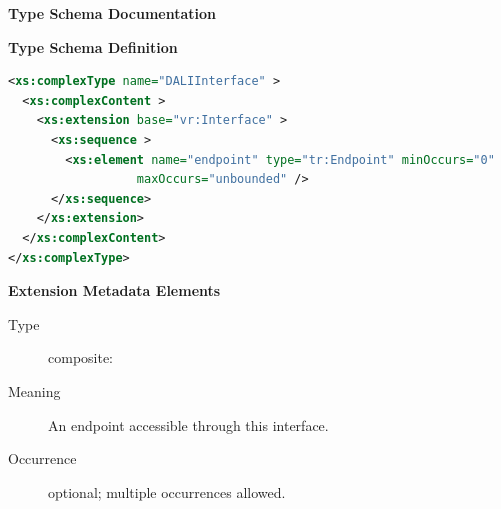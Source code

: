 \documentclass{ivoa}
\begin{document}
\begin{generated}
\begingroup
        \renewcommand*\descriptionlabel[1]{%
        \hbox to 5.5em{\emph{#1}\hfil}}\vspace{2ex}\noindent\textbf{ Type Schema Documentation}



\vspace{1ex}\noindent\textbf{ Type Schema Definition}

\begin{lstlisting}[language=XML,basicstyle=\footnotesize]
<xs:complexType name="DALIInterface" >
  <xs:complexContent >
    <xs:extension base="vr:Interface" >
      <xs:sequence >
        <xs:element name="endpoint" type="tr:Endpoint" minOccurs="0"
                  maxOccurs="unbounded" />
      </xs:sequence>
    </xs:extension>
  </xs:complexContent>
</xs:complexType>
\end{lstlisting}

\vspace{0.5ex}\noindent\textbf{ Extension Metadata Elements}

\begingroup\small\begin{bigdescription}\item[Element \xmlel{endpoint}]
\begin{description}
\item[Type] composite: 
\item[Meaning] An endpoint accessible through this interface.
\item[Occurrence] optional; multiple occurrences allowed.

\end{description}


\end{bigdescription}\endgroup

\endgroup
\end{generated}
\end{document}
